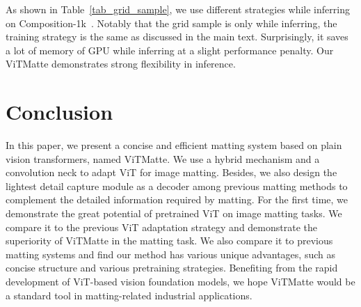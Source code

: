 \documentclass[10pt,twocolumn,letterpaper]{article}
\newcommand{\thename}{ViTMatte}
\begin{document}
As shown in Table~\ref{tab_grid_sample}, we use different strategies while inferring on Composition-1k~\cite{DIM}. Notably that the grid sample is only while inferring, the training strategy is the same as discussed in the main text. Surprisingly, it saves a lot of memory of GPU while inferring at a slight performance penalty. Our \thename{} demonstrates strong flexibility in inference.

\section{Conclusion}

In this paper, we present a concise and efficient matting system based on plain vision transformers, named \thename{}. We use a hybrid mechanism and a convolution neck to adapt ViT for image matting. Besides, we also design the lightest detail capture module as a decoder among previous matting methods to complement the detailed information required by matting. For the first time, we demonstrate the great potential of pretrained ViT on image matting tasks. We compare it to the previous ViT adaptation strategy and demonstrate the superiority of \thename{} in the matting task. We also compare it to previous matting systems and find our method has various unique advantages, such as concise structure and various pretraining strategies. Benefiting from the rapid development of ViT-based vision foundation models,  we hope \thename{} would be a standard tool in matting-related industrial applications. 


{\small


}
\end{document}
